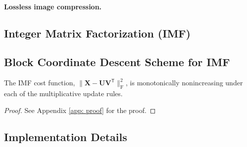 \paragraph{Lossless image compression.}



\subsection{Integer Matrix Factorization (IMF)} \label{sec: imf}



\subsection{Block Coordinate Descent Scheme for IMF} \label{sec: bcd}



\begin{theorem}  \label{the: bcd monotonicity}
The IMF cost function, $\| \bm{X} - \bm{U} \bm{V}^\mathsf{T} \|_\text{F}^2$, is monotonically nonincreasing under each of the multiplicative update rules.
\end{theorem}

\begin{proof}
See Appendix \ref{app: proof} for the proof.
\end{proof}


\subsection{Implementation Details} \label{sec: implementation details}